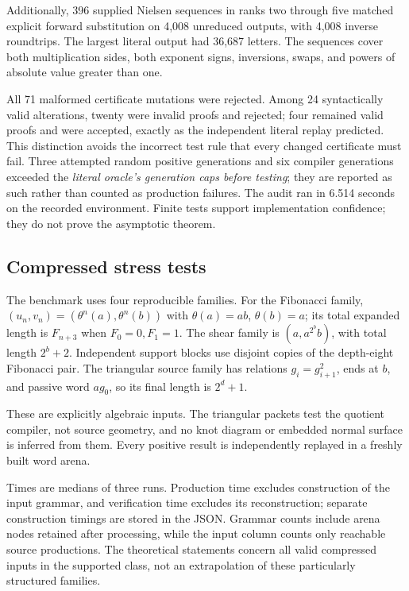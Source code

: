 \documentclass[11pt,a4paper]{article}
\theoremstyle{definition}
\theoremstyle{remark}
\begin{document}
Additionally, 396 supplied Nielsen sequences in ranks two through five
matched explicit forward substitution on 4,008 unreduced outputs, with
4,008 inverse roundtrips. The largest literal output had 36,687 letters.
The sequences cover both multiplication sides, both exponent signs,
inversions, swaps, and powers of absolute value greater than one.

All 71 malformed certificate mutations were rejected. Among 24
syntactically valid alterations, twenty were invalid proofs and rejected;
four remained valid proofs and were accepted, exactly as the independent
literal replay predicted. This distinction avoids the incorrect test rule
that every changed certificate must fail. Three attempted random positive
generations and six compiler generations exceeded the \emph{literal
oracle's generation caps before testing}; they are reported as such rather
than counted as production failures. The audit ran in 6.514 seconds on the
recorded environment. Finite tests support implementation confidence; they
do not prove the asymptotic theorem.

\subsection{Compressed stress tests}

The benchmark uses four reproducible families. For the Fibonacci family,
$(u_n,v_n)=(\theta^n(a),\theta^n(b))$ with $\theta(a)=ab$, $\theta(b)=a$;
its total expanded length is $F_{n+3}$ when $F_0=0,F_1=1$. The shear family
is $(a,a^{2^b}b)$, with total length $2^b+2$. Independent support blocks use
disjoint copies of the depth-eight Fibonacci pair. The triangular source
family has relations $g_i=g_{i+1}^2$, ends at $b$, and passive word $ag_0$,
so its final length is $2^d+1$.

These are explicitly algebraic inputs. The triangular packets test the
quotient compiler, not source geometry, and no knot diagram or embedded
normal surface is inferred from them. Every positive result is independently
replayed in a freshly built word arena.



Times are medians of three runs. Production time excludes construction of
the input grammar, and verification time excludes its reconstruction;
separate construction timings are stored in the JSON. Grammar counts
include arena nodes retained after processing, while the input column counts
only reachable source productions. The theoretical statements concern all
valid compressed inputs in the supported class, not an extrapolation of
these particularly structured families.
\end{document}
